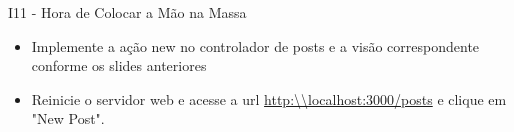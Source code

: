 \begin{frame}[t, fragile]{I11 - Hora de Colocar a Mão na Massa}
	\begin{itemize}
		\item Implemente a ação \alert{new} no controlador de posts e a visão correspondente conforme os slides anteriores
		\item Reinicie o servidor web e acesse a url \url{http:\\localhost:3000/posts} e clique em \alert{"New Post"}.
	\end{itemize}
\end{frame}